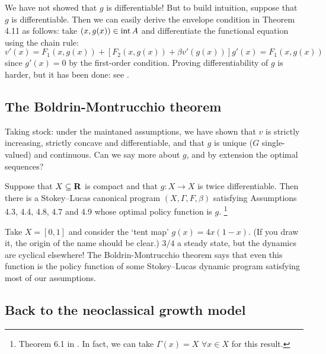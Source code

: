 \documentclass[11pt,letterpaper,reqno,oneside]{article}
\begin{document}
We have not showed that $g$ is differentiable! But to build intuition, suppose that $g$ is differentiable. Then we can easily derive the envelope condition in Theorem 4.11 as follows: take $(x,g(x)) \in \operatorname*{int} A$ and differentiate the functional equation using the chain rule:
%
\begin{equation*}
	v'(x) 
	= F_1(x,g(x)) 
	+ \left[ F_2(x,g(x)) + \beta v'(g(x)) \right] g'(x)
	= F_1(x,g(x))
\end{equation*}
%
since $g'(x) = 0$ by the first-order condition. Proving differentiability of $g$ is harder, but it has been done: see \textcite{Santos1991}.



\subsection{The Boldrin-Montrucchio theorem}
\label{sec:30Sep2015:Boldrin-Montrucchio}

Taking stock: under the maintaned assumptions, we have shown that $v$ is strictly increasing, strictly concave and differentiable, and that $g$ is unique ($G$ single-valued) and continuous. Can we say more about $g$, and by extension the optimal sequences?

\begin{theorem}
	Suppose that $X \subseteq \mathbf{R}$ is compact and that $g : X \to X$ is twice differentiable. Then there is a Stokey--Lucas canonical program $(X,\Gamma,F,\beta)$ satisfying Assumptions 4.3, 4.4, 4.8, 4.7 and 4.9 whose optimal policy function is $g$.%
		\footnote{Theorem 6.1 in \textcite{StokeyLucasPrescott1989}. In fact, we can take $\Gamma(x)=X$ $\forall x\in X$ for this result.}
\end{theorem}

\begin{example}
	Take $X=[0,1]$ and consider the `tent map' $g(x) = 4 x (1-x)$. (If you draw it, the origin of the name should be clear.) $3/4$ a steady state, but the dynamics are cyclical elsewhere! The Boldrin-Montrucchio theorem says that even this function is the policy function of some Stokey--Lucas dynamic program satisfying most of our assumptions.
\end{example}



\subsection{Back to the neoclassical growth model}
\label{sec:30Sep2015:back_to_neoclassical_growth_model}
\end{document}

